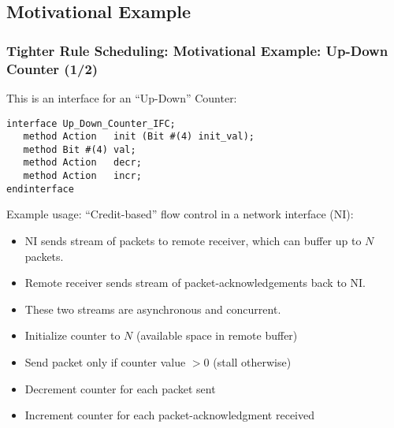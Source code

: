\subsection{Motivational Example}

\begin{frame}[fragile]
\frametitle{Tighter Rule Scheduling: Motivational Example: Up-Down Counter (1/2)}

\footnotesize

This is an interface for an ``Up-Down'' Counter:

\begin{Verbatim}[frame=single]
interface Up_Down_Counter_IFC;
   method Action   init (Bit #(4) init_val);
   method Bit #(4) val;
   method Action   decr;
   method Action   incr;
endinterface
\end{Verbatim}

\vspace{2ex}

Example usage: ``Credit-based'' flow control in a network interface (NI):
\begin{itemize}

 \item NI sends stream of packets to remote receiver, which can buffer up to $N$ packets.
 \item Remote receiver sends stream of packet-acknowledgements back to NI.
 \item These two streams are asynchronous and concurrent.

 \vspace{4ex}

 \item Initialize counter to $N$ (available space in remote buffer)
 \item Send packet only if counter value $> 0$ (stall otherwise)
 \item Decrement counter for each packet sent
 \item Increment counter for each packet-acknowledgment received

\end{itemize}

\end{frame}


